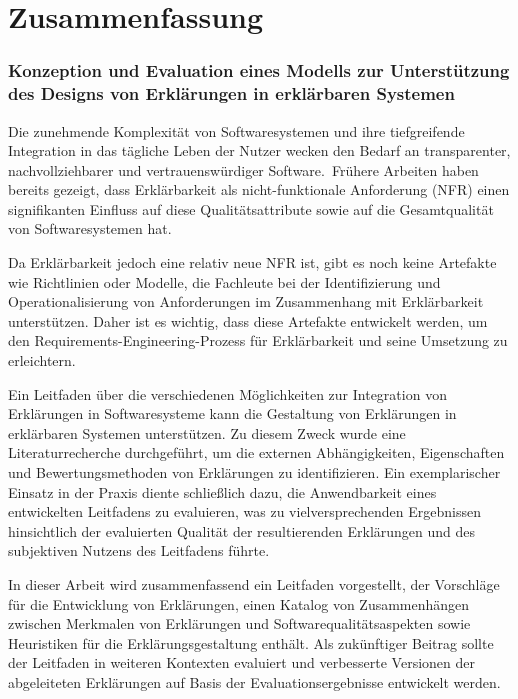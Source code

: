 \chapter*{Zusammenfassung}

\subsection*{Konzeption und Evaluation eines Modells zur Unterstützung des Designs von Erklärungen in erklärbaren Systemen}

Die zunehmende Komplexität von Softwaresystemen und ihre tiefgreifende Integration in das tägliche Leben der Nutzer wecken den Bedarf an transparenter, nachvollziehbarer und vertrauenswürdiger Software. Frühere Arbeiten haben bereits gezeigt, dass Erklärbarkeit als nicht-funktionale Anforderung (NFR) einen signifikanten Einfluss auf diese Qualitätsattribute sowie auf die Gesamtqualität von Softwaresystemen hat.

Da Erklärbarkeit jedoch eine relativ neue NFR ist, gibt es noch keine Artefakte wie Richtlinien oder Modelle, die Fachleute bei der Identifizierung und Operationalisierung von Anforderungen im Zusammenhang mit Erklärbarkeit unterstützen. Daher ist es wichtig, dass diese Artefakte entwickelt werden, um den Requirements-Engineering-Prozess für Erklärbarkeit und seine Umsetzung zu erleichtern.

Ein Leitfaden über die verschiedenen Möglichkeiten zur Integration von Erklärungen in Softwaresysteme kann die Gestaltung von Erklärungen in erklärbaren Systemen unterstützen. Zu diesem Zweck wurde eine Literaturrecherche durchgeführt, um die externen Abhängigkeiten, Eigenschaften und Bewertungsmethoden von Erklärungen zu identifizieren. Ein exemplarischer Einsatz in der Praxis diente schließlich dazu, die Anwendbarkeit eines entwickelten Leitfadens zu evaluieren, was zu vielversprechenden Ergebnissen hinsichtlich der evaluierten Qualität der resultierenden Erklärungen und des subjektiven Nutzens des Leitfadens führte. 

In dieser Arbeit wird zusammenfassend ein Leitfaden vorgestellt, der Vorschläge für die Entwicklung von Erklärungen, einen Katalog von Zusammenhängen zwischen Merkmalen von Erklärungen und Softwarequalitätsaspekten sowie Heuristiken für die Erklärungsgestaltung enthält. Als zukünftiger Beitrag sollte der Leitfaden in weiteren Kontexten evaluiert und verbesserte Versionen der abgeleiteten Erklärungen auf Basis der Evaluationsergebnisse entwickelt werden.

